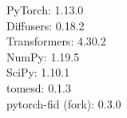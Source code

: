 PyTorch: 1.13.0\\
Diffusers: 0.18.2\\
Transformers: 4.30.2\\
NumPy: 1.19.5\\
SciPy: 1.10.1\\
tomesd: 0.1.3\\
pytorch-fid (fork): 0.3.0\\